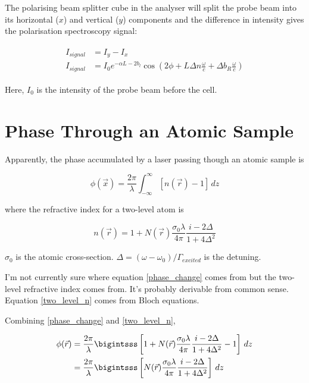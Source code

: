 \documentclass{article}
\begin{document}
\begin{multicols}{2}
The polarising beam splitter cube in the analyser will split the probe beam into its horizontal ($x$) and vertical ($y$) components and the difference in intensity gives the polarisation spectroscopy signal:

\begin{align}\begin{split}
I_{signal} &= I_y - I_x\\
I_{signal} &= I_0 e^{-\alpha L - 2b_l} \cos\left(2\phi + L \Delta n \frac{\omega}{c} + \Delta b_R\frac{\omega}{c} \right)
\end{split}\end{align}

Here, $I_0$ is the intensity of the probe beam before the cell.

\section{Phase Through an Atomic Sample}
Apparently\cite{ku_phase_2011}, the phase accumulated by a laser passing though an atomic sample is

\begin{equation}
\phi(\vec{x}) = \frac{2 \pi}{\lambda} \int_{-\infty}^{\infty}[n(\vec{r})-1] \, dz
\label{phase_change}
\end{equation}

where the refractive index for a two-level atom is\cite{turner_diffraction-contrast_2005}

\begin{equation}
n(\vec{r}) = 1 + N(\vec{r})\frac{\sigma_0 \lambda}{4 \pi} \frac{i-2\Delta}{1+4\Delta^2}
\label{two_level_n}
\end{equation}

$\sigma_0$ is the atomic cross-section. $\Delta=(\omega-\omega_0)/\Gamma_{excited}$ is the detuning.

I'm not currently sure where equation \ref{phase_change} comes from but the two-level refractive index comes from. It's probably derivable from common sense. Equation \ref{two_level_n} comes from Bloch equations.

Combining \ref{phase_change} and \ref{two_level_n},

\begin{align}\begin{split}
\phi (\vec{r}) &= \frac{2\pi}{\lambda} \bigintsss \left[1 + N(\vec{r})\frac{\sigma_0 \lambda}{4 \pi} \frac{i-2\Delta}{1+4\Delta^2} - 1 \right]\,dz\\
&= \frac{2\pi}{\lambda} \bigintsss \left[N(\vec{r})\frac{\sigma_0 \lambda}{4 \pi} \frac{i-2\Delta}{1+4\Delta^2} \right]\,dz
\end{split}\end{align}


\end{multicols}
\end{document}
